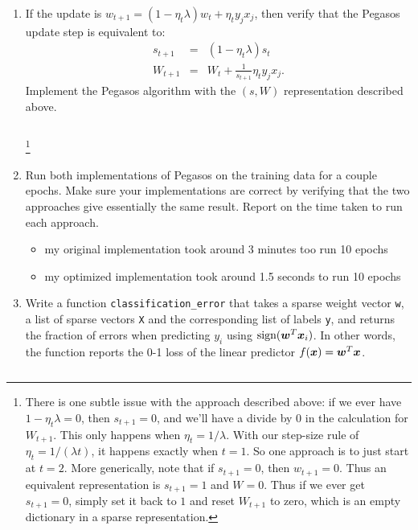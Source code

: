 \documentclass{article}
\newcommand{\code}[1]{\texttt{#1}}
\theoremstyle{plain}
\theoremstyle{definition}
\begin{document}
\begin{enumerate}
  \setcounter{enumi}{\value{saveenum}}
\item 
If the update is $w_{t+1}=(1-\eta_{t}\lambda)w_{t}+\eta_{t}y_{j}x_{j}$,
then verify that the Pegasos update step is equivalent to:
\begin{eqnarray*}
s_{t+1} & = & \left(1-\eta_{t}\lambda\right)s_{t}\\
W_{t+1} & = & W_{t}+\frac{1}{s_{t+1}}\eta_{t}y_{j}x_{j}.
\end{eqnarray*}
Implement the Pegasos algorithm with the $(s,W)$ representation
described above.
\begin{itemize}
    \color{blue}
      \inputminted[firstline=1074, lastline=1106, breaklines=True]{python}{hw_3.py}
\end{itemize}


\footnote{There is one subtle issue with the approach described above: if we
ever have $1-\eta_{t}\lambda=0$, then $s_{t+1}=0$, and we'll have
a divide by $0$ in the calculation for $W_{t+1}$. This only happens
when $\eta_{t}=1/\lambda$. With our step-size rule of $\eta_{t}=1/\left(\lambda t\right)$,
it happens exactly when $t=1$. So one approach is to just start at
$t=2$. More generically, note that if $s_{t+1}=0$, then $w_{t+1}=0$.
Thus an equivalent representation is $s_{t+1}=1$ and $W=0$. Thus
if we ever get $s_{t+1}=0$, simply set it back to $1$ and reset
$W_{t+1}$ to zero, which is an empty dictionary in a sparse representation.}



\item Run both implementations of Pegasos on the training data for a couple
epochs. Make sure your implementations are correct by verifying that the two
approaches give essentially the same result. Report on the time taken
to run each approach.\\
\begin{itemize}
    \color{blue}
    \item my original implementation took around 3 minutes too run 10 epochs 
    \item my optimized implementation took around 1.5 seconds to run 10 epochs
\end{itemize}

\item Write a function \code{classification\_error} that takes a sparse weight vector \code{w}, a list of sparse vectors \code{X} and the corresponding list of labels \code{y}, and returns the fraction of errors when predicting $y_i$
using $\textrm{sign}(\boldsymbol{w}^{T}\boldsymbol{x}_i)$. In other words, the function reports the 0-1
loss of the linear predictor $f(\boldsymbol{x}) = \boldsymbol{w}^{T}\boldsymbol{x}$.
\begin{itemize}
    \color{blue}
      \inputminted[firstline=211, lastline=234, breaklines=True]{python}{hw_3.py}
\end{itemize}





\end{enumerate}
\end{document}
